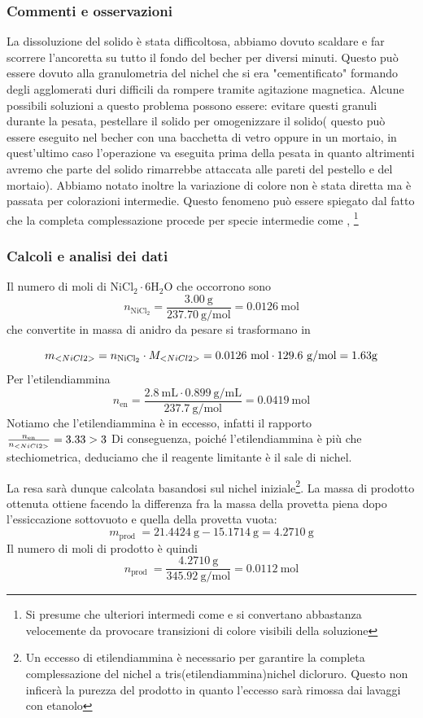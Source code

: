 \subsubsection{Commenti e osservazioni}
La dissoluzione del solido è stata difficoltosa, abbiamo dovuto scaldare e far scorrere l'ancoretta su tutto il fondo del becher per diversi minuti. Questo può essere dovuto alla granulometria del nichel che si era "cementificato" formando degli agglomerati duri difficili da rompere tramite agitazione magnetica. Alcune possibili soluzioni a questo problema possono essere: evitare questi granuli durante la pesata, pestellare il solido per omogenizzare il solido( questo può essere eseguito nel becher con una bacchetta di vetro oppure in un mortaio, in quest'ultimo caso l'operazione va eseguita prima della pesata in quanto altrimenti avremo che parte del solido rimarrebbe attaccata alle pareti del pestello e del mortaio).
Abbiamo notato inoltre la variazione di colore non è stata diretta ma è passata per colorazioni intermedie. Questo fenomeno può essere spiegato dal fatto che la completa complessazione procede per specie intermedie come ,  \footnote{Si presume che ulteriori intermedi come  e   si convertano abbastanza velocemente da provocare transizioni di colore visibili della soluzione  }


\subsubsection{Calcoli e analisi dei dati}

Il numero di moli di $\mathrm{NiCl}_2 \cdot 6 \mathrm{H}_2 \mathrm{O}$ che occorrono sono
$$
n_{\mathrm{NiCl}_2}=\frac{3.00 \mathrm{~g}}{237.70 \mathrm{~g} / \mathrm{mol}}=0.0126 \mathrm{~mol}
$$
che convertite in massa di  anidro da pesare si trasformano in

\[  {m_{\ce{NiCl2}}} = n_{\mathrm{NiCl}_2} \cdot {M_{\ce{NiCl2}}} = 0.0126 \mathrm{~mol} \cdot 129.6  \ \text{g/mol} = 1.63 \text{g} \]
Per l'etilendiammina
$$
n_{\mathrm{en}}=\frac{2.8 \mathrm{~mL} \cdot 0.899 \mathrm{~g} / \mathrm{mL}}{237.7 \mathrm{~g} / \mathrm{mol}}=0.0419 \mathrm{~mol}
$$
Notiamo che l'etilendiammina è in eccesso, infatti il rapporto $\frac{n_{\text{en}}}{{n_{<NiCl2>}}} = 3.33 > 3$
Di conseguenza, poiché l'etilendiammina è più che stechiometrica, deduciamo che il reagente limitante è il sale di nichel. 

La resa sarà dunque calcolata basandosi sul nichel iniziale\footnote{Un eccesso di etilendiammina è necessario per garantire la completa complessazione del nichel a tris(etilendiammina)nichel dicloruro. Questo non inficerà la purezza del prodotto in quanto l'eccesso sarà rimossa dai lavaggi con etanolo}. 
La massa di prodotto ottenuta ottiene facendo la differenza fra la massa della provetta piena dopo l'essiccazione sottovuoto e quella della provetta vuota:
$$
m_{\text {prod }}=21.4424  \mathrm{~g}- 15.1714 \mathrm{~g}= 4.2710 \mathrm{~g}
$$
Il numero di moli di prodotto è quindi
$$
n_{\text {prod }}=\frac{4.2710 \mathrm{~g}}{345.92 \mathrm{~g} / \mathrm{mol}}=0.0112 \mathrm{~mol}$$ 

